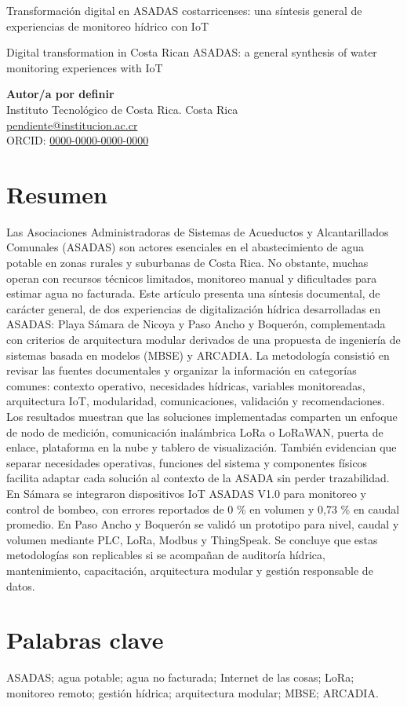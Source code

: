 \documentclass[12pt,letterpaper]{article}
\newcommand{\TEMtitle}[1]{%
  \begin{center}
    {\fontsize{28}{32}\selectfont #1\par}
  \end{center}
}
\newcommand{\TEMauthor}[4]{%
  \noindent\textbf{#1}\\
  #2\\
  \href{mailto:#3}{#3}\\
  ORCID: \href{https://orcid.org/#4}{#4}\par
  \vspace{0.25\baselineskip}
}
\begin{document}
\TEMtitle{Transformación digital en ASADAS costarricenses: una síntesis general de experiencias de monitoreo hídrico con IoT}

\TEMtitle{Digital transformation in Costa Rican ASADAS: a general synthesis of water monitoring experiences with IoT}

\vspace{0.5\baselineskip}

\TEMauthor{Autor/a por definir}{Instituto Tecnológico de Costa Rica. Costa Rica}{pendiente@institucion.ac.cr}{0000-0000-0000-0000}

\section{Resumen}
Las Asociaciones Administradoras de Sistemas de Acueductos y Alcantarillados Comunales (ASADAS) son actores esenciales en el abastecimiento de agua potable en zonas rurales y suburbanas de Costa Rica. No obstante, muchas operan con recursos técnicos limitados, monitoreo manual y dificultades para estimar agua no facturada. Este artículo presenta una síntesis documental, de carácter general, de dos experiencias de digitalización hídrica desarrolladas en ASADAS: Playa Sámara de Nicoya y Paso Ancho y Boquerón, complementada con criterios de arquitectura modular derivados de una propuesta de ingeniería de sistemas basada en modelos (MBSE) y ARCADIA. La metodología consistió en revisar las fuentes documentales y organizar la información en categorías comunes: contexto operativo, necesidades hídricas, variables monitoreadas, arquitectura IoT, modularidad, comunicaciones, validación y recomendaciones. Los resultados muestran que las soluciones implementadas comparten un enfoque de nodo de medición, comunicación inalámbrica LoRa o LoRaWAN, puerta de enlace, plataforma en la nube y tablero de visualización. También evidencian que separar necesidades operativas, funciones del sistema y componentes físicos facilita adaptar cada solución al contexto de la ASADA sin perder trazabilidad. En Sámara se integraron dispositivos IoT ASADAS V1.0 para monitoreo y control de bombeo, con errores reportados de 0 \% en volumen y 0,73 \% en caudal promedio. En Paso Ancho y Boquerón se validó un prototipo para nivel, caudal y volumen mediante PLC, LoRa, Modbus y ThingSpeak. Se concluye que estas metodologías son replicables si se acompañan de auditoría hídrica, mantenimiento, capacitación, arquitectura modular y gestión responsable de datos.

\section{Palabras clave}
ASADAS; agua potable; agua no facturada; Internet de las cosas; LoRa; monitoreo remoto; gestión hídrica; arquitectura modular; MBSE; ARCADIA.
\end{document}
